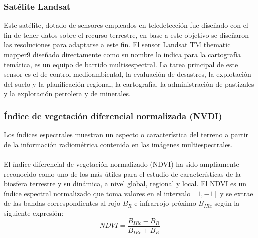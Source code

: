 \documentclass[xcolor=table]{beamer}
\begin{document}
\begin{frame}\frametitle{Sat\'elite Landsat}
	Este sat\'elite, dotado de sensores empleados en teledetecci\'on fue dise\~{n}ado con
	el fin de tener datos sobre el recurso terrestre, en base a este objetivo se dise\~{n}aron las
	resoluciones para adaptarse a este fin. El sensor Landsat TM thematic mapper9
	dise\~{n}ado directamente como su nombre lo indica para la cartograf\'ia tem\'atica, es un
	equipo de barrido multi\textendash sespectral. La tarea principal de este sensor es el de control
	medioambiental, la evaluaci\'on de desastres, la explotaci\'on del suelo y la
	planificaci\'on regional, la cartograf\'ia, la administraci\'on de pastizales y la exploraci\'on
	petrolera y de minerales.
	
\end{frame}

\begin{frame}\frametitle{\'Indice de vegetaci\'on diferencial normalizada (NVDI)}
	Los \'indices espectrales muestran un aspecto o caracter\'istica del terreno a partir de la informaci\'on radiom\'etrica contenida en las im\'agenes multiespectrales.\\~\\
	El \'indice diferencial de vegetaci\'on normalizado (NDVI) ha sido ampliamente reconocido como uno de los m\'as \'utiles para el estudio de caracter\'isticas de la biosfera terrestre y su din\'amica, a nivel global, regional y local. El NDVI es un \'indice espectral normalizado que toma valores en el intervalo $[1,-1]$ y se extrae de las bandas correspondientes al rojo $B_{R}$ e infrarrojo pr\'oximo $B_{IRc}$ seg\'un la siguiente expresi\'on:
	\begin{equation}
	NDVI=\dfrac{B_{IRc}-B_{R}}{B_{IRc}+B_{R}}
	\end{equation}

\end{frame}
\end{document}
